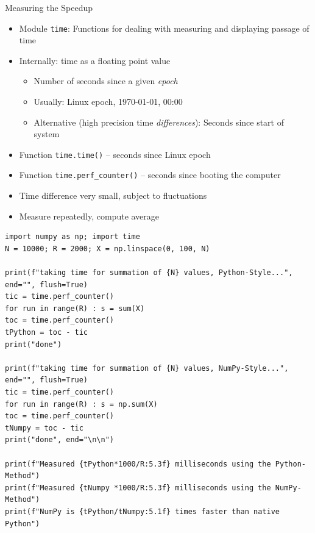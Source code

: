 
\begin{frame}[fragile]{Measuring the Speedup}
%
\begin{itemize}
\item Module \texttt{time}: Functions for dealing with measuring and displaying passage of time
\item Internally: time as a floating point value
	\begin{itemize}
	\item Number of seconds since a given \emph{epoch}
	\item Usually: Linux epoch, 1970-01-01, 00:00
	\item Alternative (high precision time \emph{differences}): Seconds since start of system
	\end{itemize}
\item Function \texttt{time.time()} -- seconds since Linux epoch
\item Function \texttt{time.perf\_counter()} -- seconds since booting the computer
\item Time difference very small, subject to fluctuations
\item Measure repeatedly, compute average
\end{itemize}
%
\end{frame}


\begin{frame}[fragile]
%
\vspace{-3pt}
\begin{codebox}
\begin{verbatim}
import numpy as np; import time
N = 10000; R = 2000; X = np.linspace(0, 100, N)

print(f"taking time for summation of {N} values, Python-Style...", end="", flush=True)
tic = time.perf_counter()
for run in range(R) : s = sum(X)
toc = time.perf_counter()
tPython = toc - tic
print("done")

print(f"taking time for summation of {N} values, NumPy-Style...", end="", flush=True)
tic = time.perf_counter()
for run in range(R) : s = np.sum(X)
toc = time.perf_counter()
tNumpy = toc - tic
print("done", end="\n\n")

print(f"Measured {tPython*1000/R:5.3f} milliseconds using the Python-Method")
print(f"Measured {tNumpy *1000/R:5.3f} milliseconds using the NumPy-Method")
print(f"NumPy is {tPython/tNumpy:5.1f} times faster than native Python")
\end{verbatim}
\end{codebox}
%
\end{frame}

